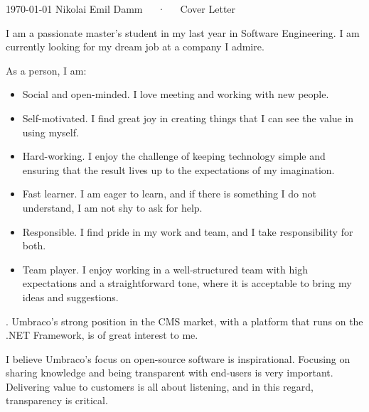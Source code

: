 \documentclass[11pt, a4paper]{awesome-cv}
\begin{document}
\makecvheader[R]

\makecvfooter
  {\today}
  {Nikolai Emil Damm~~~·~~~Cover Letter}
  {}

\makelettertitle

\begin{cvletter}
\vspace*{-\baselineskip}
I am a passionate master's student in my last year in Software Engineering. I am currently looking for my dream job at a company I admire.

As a person, I am:

\begin{itemize}
  \item Social and open-minded. I love meeting and working with new people.
  \item Self-motivated. I find great joy in creating things that I can see the value in using myself.
  \item Hard-working. I enjoy the challenge of keeping technology simple and ensuring that the result lives up to the expectations of my imagination.
  \item Fast learner. I am eager to learn, and if there is something I do not understand, I am not shy to ask for help.
  \item Responsible. I find pride in my work and team, and I take responsibility for both.
  \item Team player. I enjoy working in a well-structured team with high expectations and a straightforward tone, where it is acceptable to bring my ideas and suggestions.
\end{itemize}.\vspace*{-\baselineskip}\vspace*{-\baselineskip}
Umbraco's strong position in the CMS market, with a platform that runs on the .NET Framework, is of great interest to me. 

I believe Umbraco's focus on open-source software is inspirational. Focusing on sharing knowledge and being transparent with end-users is very important. Delivering value to customers is all about listening, and in this regard, transparency is critical.


\end{cvletter}
\end{document}
